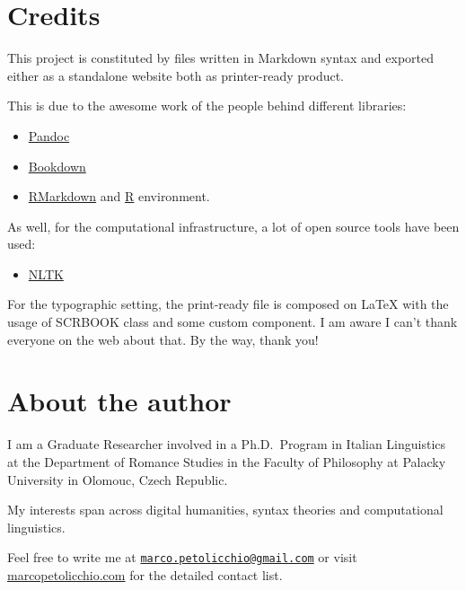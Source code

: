 \documentclass[a4paper,twoside,12pt,chapterprefix=false,bibliography=totocnumbered,listof=flat]{scrbook}
\providecommand{\tightlist}{%
  \setlength{\itemsep}{0pt}\setlength{\parskip}{0pt}}
\theoremstyle{definition}
\theoremstyle{definition}
\theoremstyle{definition}
\theoremstyle{remark}
\begin{document}
\section*{Credits}\label{credits}

This project is constituted by files written in Markdown syntax and
exported either as a standalone website both as printer-ready product.

This is due to the awesome work of the people behind different
libraries:

\begin{itemize}
\tightlist
\item
  \href{https://bookdown.org}{Pandoc}
\item
  \href{https://bookdown.org}{Bookdown}
\item
  \href{https://bookdown.org}{RMarkdown} and
  \href{https://bookdown.org}{R} environment.
\end{itemize}

As well, for the computational infrastructure, a lot of open source
tools have been used:

\begin{itemize}
\tightlist
\item
  \href{https://bookdown.org}{NLTK}
\end{itemize}

For the typographic setting, the print-ready file is composed on LaTeX
with the usage of SCRBOOK class and some custom component. I am aware I
can't thank everyone on the web about that. By the way, thank you!

\section*{About the author}\label{about-the-author}

I am a Graduate Researcher involved in a Ph.D.~Program in Italian
Linguistics at the Department of Romance Studies in the Faculty of
Philosophy at Palacky University in Olomouc, Czech Republic.

My interests span across digital humanities, syntax theories and
computational linguistics.

Feel free to write me at
\href{mailto:marco.petolicchio@gmail.com}{\nolinkurl{marco.petolicchio@gmail.com}}
or visit \href{http://marcopetolicchio.com}{marcopetolicchio.com} for
the detailed contact list.


\end{document}
